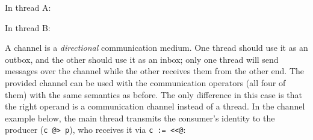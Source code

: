 In thread A:


In thread B:


A channel is a \emph{directional} communication medium.  One thread should use
it as an outbox, and the other should use it as an inbox; only one thread will
send messages over the channel while the other receives them from the other
end. The provided channel can be used with the communication operators (all four
of them) with the same semantics as before. The only difference in this case is
that the right operand is a communication channel instead of a thread.  In the
channel example below, the main thread transmits the consumer's identity to the
producer (\texttt{c @> p}), who receives it via \texttt{c := <{}<@}:


